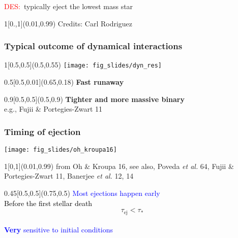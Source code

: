 \documentclass[xcolor=dvipsnames,professionalfonts, aspectratio=169]{beamer}
\begin{document}
\bgroup
{}
\begin{frame}{\textcolor{red}{DES:}~\textcolor{whiteish}{typically eject the lowest mass star}}
  \centering

  \begin{textblock}{1}[0.,1](0.01,0.99)
    \textcolor{gray!50}{\tiny Credits: Carl Rodriguez}
  \end{textblock}

\end{frame}



\begin{frame}
   \frametitle{\textcolor{white!80!Yellow}{Typical outcome of dynamical
       interactions}}
   \begin{textblock}{1}[0.5,0.5](0.5,0.55)
     \centering
     \texttt{[image: fig\_slides/dyn\_res]}
   \end{textblock}

   \begin{textblock}{0.5}[0.5,0.01](0.65,0.18)
     \centering
     \textcolor{white!80!Yellow}{\Large \bf Fast runaway }
   \end{textblock}


   \begin{textblock}{0.9}[0.5,0.5](0.5,0.9)
     \centering
     \textcolor{white!80!Yellow}{\Large \bf \phantom{Fast ejection +}Tighter and more massive binary}\\
     \hfill\textcolor{gray!50}{\tiny e.g., Fujii \& Portegies-Zwart
       11}
   \end{textblock}


\end{frame}
\egroup


\begin{frame}
  \frametitle{Timing of ejection}

  \texttt{[image: fig\_slides/oh\_kroupa16]}

  \begin{textblock}{1}[0,1](0.01,0.99)
    \textcolor{gray!50}{\tiny from Oh \& Kroupa 16, \linebreak see also, Poveda \emph{et
      al.} 64, Fujii \& Portegies-Zwart 11, Banerjee \emph{et al.} 12,
  14}\hfill\,
  \end{textblock}

  \begin{textblock}{0.45}[0.5,0.5](0.75,0.5)
    \centering
    \textcolor{Blue}{Most ejections happen early}\\
    \textcolor{Black}{Before the first stellar death}\\
    $$ \tau_\mathrm{ej} < \tau_*$$\\
    \vspace*{30pt}
    \textcolor{Blue}{{\bf Very} sensitive to initial conditions}
  \end{textblock}
\end{frame}
\end{document}
